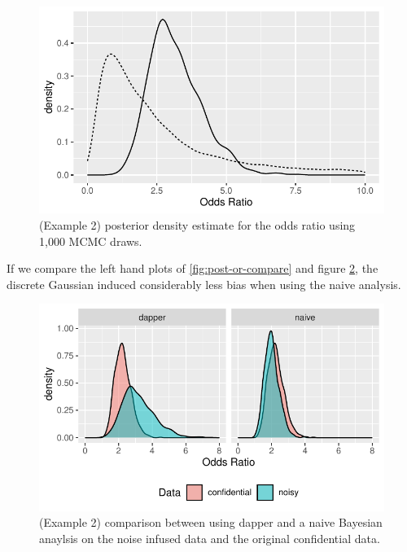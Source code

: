 \begin{figure}

{\centering \includegraphics{dppaper_files/figure-latex/post-or-density-dg-1} 

}

\caption{(Example 2) posterior density estimate for the odds ratio using 1,000 MCMC draws.}\label{fig:post-or-density-dg}
\end{figure}

If we compare the left hand plots of
\ref{fig:post-or-compare} and figure \ref{fig:post-or-compare-dg},
the discrete Gaussian induced considerably less bias when using the naive analysis.

\begin{figure}

{\centering \includegraphics{dppaper_files/figure-latex/post-or-compare-dg-1} 

}

\caption{(Example 2) comparison between using dapper and a naive Bayesian anaylsis on the
noise infused data and the original confidential data.}\label{fig:post-or-compare-dg}
\end{figure}


